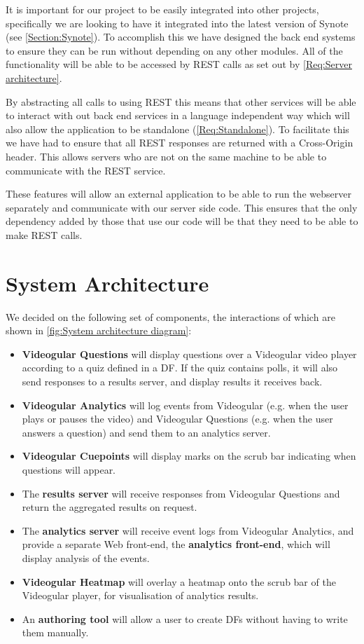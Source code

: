 It is important for our project to be easily integrated into other projects, specifically we are looking to have it integrated into the latest version of Synote (see \autoref{Section:Synote}). To accomplish this we have designed the back end systems to ensure they can be run without depending on any other modules. All of the functionality will be able to be accessed by \gls{REST} calls as set out by \cref{Req:Server architecture}.

By abstracting all calls to using \gls{REST} this means that other services will be able to interact with out back end services in a language independent way which will also allow the application to be standalone (\cref{Req:Standalone}). To facilitate this we have had to ensure that all \gls{REST} responses are returned with a Cross-Origin header. This allows servers who are not on the same machine to be able to communicate with the \gls{REST} service.

These features will allow an external application to be able to run the webserver separately and communicate with our server side code. This ensures that the only dependency added by those that use our code will be that they need to be able to make \gls{REST} calls.

\section{System Architecture}

We decided on the following set of components, the interactions of which are shown in \autoref{fig:System architecture diagram}:

\begin{itemize}
	\item
		\textbf{Videogular Questions} will display questions over a \gls{Videogular} video player according to a quiz defined in a \gls{DF}. If the quiz contains polls, it will also send responses to a results server, and display results it receives back.
	\item
		\textbf{Videogular Analytics} will log events from \gls{Videogular} (e.g. when the user plays or pauses the video) and Videogular Questions (e.g. when the user answers a question) and send them to an analytics server.
	\item
		\textbf{Videogular Cuepoints} will display marks on the scrub bar indicating when questions will appear.
	\item
		The \textbf{results server} will receive responses from Videogular Questions and return the aggregated results on request.
	\item
		The \textbf{analytics server} will receive event logs from Videogular Analytics, and provide a separate Web front-end, the \textbf{analytics front-end}, which will display analysis of the events.
	\item
		\textbf{Videogular Heatmap} will overlay a heatmap onto the scrub bar of the \gls{Videogular} player, for visualisation of analytics results.
	\item
		An \textbf{authoring tool} will allow a user to create \glspl{DF} without having to write them manually.
\end{itemize}


